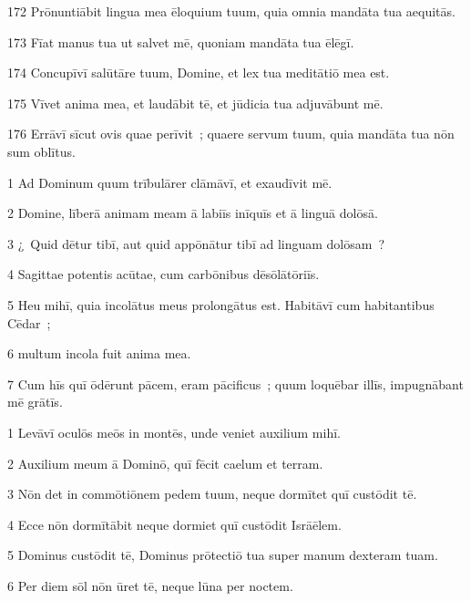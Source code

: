 \psalmVerse
  {172}
  {Prōnuntiābit lingua mea ēloquium tuum, quia omnia mandāta tua aequitās.}


\psalmVerse
  {173}
  {Fīat manus tua ut salvet mē, quoniam mandāta tua ēlēgī.}


\psalmVerse
  {174}
  {Concupīvī salūtāre tuum, Domine, et lex tua meditātiō mea est.}


\psalmVerse
  {175}
  {Vīvet anima mea, et laudābit tē, et jūdicia tua adjuvābunt mē.}


\psalmVerse
  {176}
  {Errāvī sīcut ovis quae perīvit~; quaere servum tuum, quia mandāta tua nōn sum oblītus.}




\psalmVerse
  {\phantom{00}1}
  {Ad Dominum quum trībulārer clāmāvī, et exaudīvit mē.}


\psalmVerse
  {\phantom{00}2}
  {Domine, līberā animam meam ā labiīs inīquīs et ā linguā dolōsā.}


\psalmVerse
  {\phantom{00}3}
  {¿~Quid dētur tibī, aut quid appōnātur tibī ad linguam dolōsam~?}


\psalmVerse
  {\phantom{00}4}
  {Sagittae potentis acūtae, cum carbōnibus dēsōlātōriīs.}


\psalmVerse
  {\phantom{00}5}
  {Heu mihī, quia incolātus meus prolongātus est. Habitāvī cum habitantibus Cēdar~;}


\psalmVerse
  {\phantom{00}6}
  {multum incola fuit anima mea.}


\psalmVerse
  {\phantom{00}7}
  {Cum hīs quī ōdērunt pācem, eram pācificus~; quum loquēbar illīs, impugnābant mē grātīs.}



\psalmVerse
  {\phantom{00}1}
  {Levāvī oculōs meōs in montēs, unde veniet auxilium mihī.}


\psalmVerse
  {\phantom{00}2}
  {Auxilium meum ā Dominō, quī fēcit caelum et terram.}


\psalmVerse
  {\phantom{00}3}
  {Nōn det in commōtiōnem pedem tuum, neque dormītet quī custōdit tē.}


\psalmVerse
  {\phantom{00}4}
  {Ecce nōn dormītābit neque dormiet quī custōdit Isrāēlem.}


\psalmVerse
  {\phantom{00}5}
  {Dominus custōdit tē, Dominus prōtectiō tua super manum dexteram tuam.}


\psalmVerse
  {\phantom{00}6}
  {Per diem sōl nōn ūret tē, neque lūna per noctem.}


